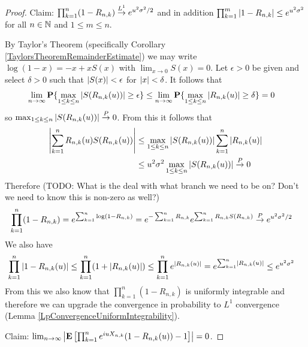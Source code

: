 \begin{proof}
Claim: $\prod_{k=1}^n (1 - R_{n,k}) \overset{L^1}\to e^{u^2 \sigma^2/2}$ and in addition $\prod_{k=1}^m \left \vert 1 - R_{n,k} \right \vert \leq e^{u^2 \sigma^2}$ for all $n \in \mathbb{N}$ and $1 \leq m \leq n$.

By Taylor's Theorem (specifically Corollary \ref {TaylorsTheoremRemainderEstimate}) we may write $\log(1-x) = -x + xS(x)$ with $\lim_{x \to 0} S(x) = 0$.  Let $\epsilon > 0$ be given and select $\delta > 0$ such that $\left \vert S(x) \right \vert < \epsilon$ for $\left \vert x \right \vert < \delta$.  It follows that
\begin{align*}
\lim_{n \to \infty} \textbf{P}\{\max_{1 \leq k \leq n} \left \vert S(R_{n,k}(u)) \right \vert \geq \epsilon\} 
&\leq \lim_{n \to \infty} \textbf{P}\{\max_{1 \leq k \leq n} \left \vert R_{n,k}(u) \right \vert \geq \delta\}  = 0
\end{align*}
so $\max_{1 \leq k \leq n}  \left \vert S(R_{n,k}(u)) \right \vert \overset{P}\to 0$.   From this it follows that 
\begin{align*}
\left \vert \sum_{k=1}^n R_{n,k}(u) S(R_{n,k}(u))  \right \vert 
&\leq
\max_{1 \leq k \leq n}  \left \vert S(R_{n,k}(u)) \right \vert \sum_{k=1}^n \left \vert R_{n,k}(u) \right \vert  \\
&\leq 
u^2 \sigma^2 \max_{1 \leq k \leq n}  \left \vert S(R_{n,k}(u)) \right \vert \overset{P}\to 0
\end{align*}
Therefore  (TODO: What is the deal with what branch we need to be on?  Don't we need to know this is non-zero as well?)
\begin{align*} 
\prod_{k=1}^n (1 - R_{n,k})
&=e^{\sum_{k=1}^n \log(1 - R_{n,k})}
=e^{-\sum_{k=1}^n R_{n,k} }e^{\sum_{k=1}^n R_{n,k} S(R_{n,k})} \overset{P}\to e^{u^2 \sigma^2/2}
\end{align*}
We also have
\begin{align*}
\prod_{k=1}^n \left \vert 1 - R_{n,k}(u) \right \vert 
&\leq \prod_{k=1}^n (1 + \left \vert R_{n,k}(u) \right \vert ) 
\leq \prod_{k=1}^n e^{\left \vert R_{n,k}(u) \right \vert }
= e^{\sum_{k=1}^n \left \vert R_{n,k}(u) \right \vert} \leq e^{u^2 \sigma^2}
\end{align*}
From this we also know that $\prod_{k=1}^n (1 - R_{n,k})$ is uniformly integrable and therefore
we can upgrade the convergence in probability to $L^1$ convergence (Lemma \ref{LpConvergenceUniformIntegrability}).

Claim: $\lim_{n \to \infty} \left \vert \textbf{E}\left[\prod_{k=1}^n e^{iuX_{n,k}} (1 - R_{n,k}(u)) - 1\right] \right \vert  = 0$.


\end{proof}
